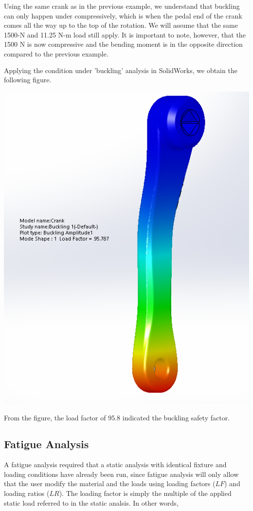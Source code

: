 \documentclass[a4paper,openany,12pt]{book}
\begin{document}
{{Using the same crank as in the previous example, we understand that
buckling can only happen under compressively, which is when the pedal
end of the crank comes all the way up to the top of the rotation. We
will assume that the same 1500-N and 11.25 N-m load still apply. It is
important to note, however, that the 1500 N is now compressive and the
bending moment is in the opposite direction compared to the previous
example.

Applying the condition under 'buckling' analysis in SolidWorks, we
obtain the following figure.


\begin{center}
\includegraphics[width=.9\linewidth]{pictures/Intro-CAD/Crank-buckling.png}
\end{center}

From the figure, the load factor of 95.8 indicated the buckling safety
factor.

\subsection{Fatigue Analysis}
\label{sec:org5a3682a}
A fatigue analysis required that a static analysis with identical
fixture and loading conditions have already been run, since fatigue
analysis will only allow that the user modify the material and the loads
using loading factors (\(LF\)) and loading ratios (\(LR\)). The loading
factor is simply the multiple of the applied static load referred to in
the static analsis. In other words,

}}
\end{document}
